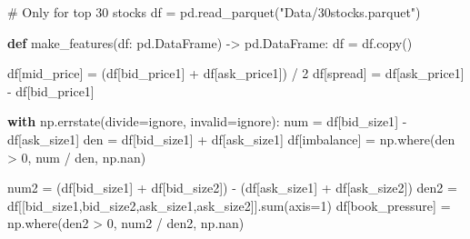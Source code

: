 \documentclass[
  letterpaper,
  DIV=11,
  numbers=noendperiod]{scrartcl}
\newenvironment{Shaded}{\begin{snugshade}}{\end{snugshade}}
\newcommand{\BuiltInTok}[1]{\textcolor[rgb]{0.00,0.23,0.31}{#1}}
\newcommand{\CommentTok}[1]{\textcolor[rgb]{0.37,0.37,0.37}{#1}}
\newcommand{\ControlFlowTok}[1]{\textcolor[rgb]{0.00,0.23,0.31}{\textbf{#1}}}
\newcommand{\DecValTok}[1]{\textcolor[rgb]{0.68,0.00,0.00}{#1}}
\newcommand{\KeywordTok}[1]{\textcolor[rgb]{0.00,0.23,0.31}{\textbf{#1}}}
\newcommand{\NormalTok}[1]{\textcolor[rgb]{0.00,0.23,0.31}{#1}}
\newcommand{\OperatorTok}[1]{\textcolor[rgb]{0.37,0.37,0.37}{#1}}
\newcommand{\StringTok}[1]{\textcolor[rgb]{0.13,0.47,0.30}{#1}}
\begin{document}
\begin{Shaded}
\begin{Highlighting}[]
\CommentTok{\# Only for top 30 stocks}
\NormalTok{df }\OperatorTok{=}\NormalTok{ pd.read\_parquet(}\StringTok{"Data/30stocks.parquet"}\NormalTok{)}

\KeywordTok{def}\NormalTok{ make\_features(df: pd.DataFrame) }\OperatorTok{{-}\textgreater{}}\NormalTok{ pd.DataFrame:}
\NormalTok{    df }\OperatorTok{=}\NormalTok{ df.copy()}

\NormalTok{    df[}\StringTok{\textquotesingle{}mid\_price\textquotesingle{}}\NormalTok{] }\OperatorTok{=}\NormalTok{ (df[}\StringTok{\textquotesingle{}bid\_price1\textquotesingle{}}\NormalTok{] }\OperatorTok{+}\NormalTok{ df[}\StringTok{\textquotesingle{}ask\_price1\textquotesingle{}}\NormalTok{]) }\OperatorTok{/} \DecValTok{2}
\NormalTok{    df[}\StringTok{\textquotesingle{}spread\textquotesingle{}}\NormalTok{]    }\OperatorTok{=}\NormalTok{ df[}\StringTok{\textquotesingle{}ask\_price1\textquotesingle{}}\NormalTok{] }\OperatorTok{{-}}\NormalTok{ df[}\StringTok{\textquotesingle{}bid\_price1\textquotesingle{}}\NormalTok{]}
    
    \ControlFlowTok{with}\NormalTok{ np.errstate(divide}\OperatorTok{=}\StringTok{\textquotesingle{}ignore\textquotesingle{}}\NormalTok{, invalid}\OperatorTok{=}\StringTok{\textquotesingle{}ignore\textquotesingle{}}\NormalTok{):}
\NormalTok{        num  }\OperatorTok{=}\NormalTok{ df[}\StringTok{\textquotesingle{}bid\_size1\textquotesingle{}}\NormalTok{] }\OperatorTok{{-}}\NormalTok{ df[}\StringTok{\textquotesingle{}ask\_size1\textquotesingle{}}\NormalTok{]}
\NormalTok{        den  }\OperatorTok{=}\NormalTok{ df[}\StringTok{\textquotesingle{}bid\_size1\textquotesingle{}}\NormalTok{] }\OperatorTok{+}\NormalTok{ df[}\StringTok{\textquotesingle{}ask\_size1\textquotesingle{}}\NormalTok{]}
\NormalTok{        df[}\StringTok{\textquotesingle{}imbalance\textquotesingle{}}\NormalTok{] }\OperatorTok{=}\NormalTok{ np.where(den }\OperatorTok{\textgreater{}} \DecValTok{0}\NormalTok{, num }\OperatorTok{/}\NormalTok{ den, np.nan)}

\NormalTok{        num2 }\OperatorTok{=}\NormalTok{ (df[}\StringTok{\textquotesingle{}bid\_size1\textquotesingle{}}\NormalTok{] }\OperatorTok{+}\NormalTok{ df[}\StringTok{\textquotesingle{}bid\_size2\textquotesingle{}}\NormalTok{]) }\OperatorTok{{-}}\NormalTok{ (df[}\StringTok{\textquotesingle{}ask\_size1\textquotesingle{}}\NormalTok{] }\OperatorTok{+}\NormalTok{ df[}\StringTok{\textquotesingle{}ask\_size2\textquotesingle{}}\NormalTok{])}
\NormalTok{        den2 }\OperatorTok{=}\NormalTok{ df[[}\StringTok{\textquotesingle{}bid\_size1\textquotesingle{}}\NormalTok{,}\StringTok{\textquotesingle{}bid\_size2\textquotesingle{}}\NormalTok{,}\StringTok{\textquotesingle{}ask\_size1\textquotesingle{}}\NormalTok{,}\StringTok{\textquotesingle{}ask\_size2\textquotesingle{}}\NormalTok{]].}\BuiltInTok{sum}\NormalTok{(axis}\OperatorTok{=}\DecValTok{1}\NormalTok{)}
\NormalTok{        df[}\StringTok{\textquotesingle{}book\_pressure\textquotesingle{}}\NormalTok{] }\OperatorTok{=}\NormalTok{ np.where(den2 }\OperatorTok{\textgreater{}} \DecValTok{0}\NormalTok{, num2 }\OperatorTok{/}\NormalTok{ den2, np.nan)}


\end{Highlighting}
\end{Shaded}
\end{document}
